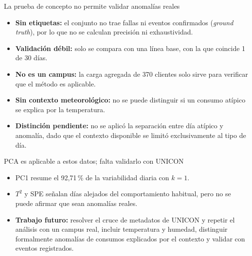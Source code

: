 \begin{frame}{La prueba de concepto no permite validar anomalías reales}
    \begin{itemize}
        \item \textbf{Sin etiquetas:} el conjunto no trae fallas ni eventos confirmados (\emph{ground truth}), por lo que no se calculan precisión ni exhaustividad.
        \item \textbf{Validación débil:} solo se compara con una línea base, con la que coincide 1 de 30 días.
        \item \textbf{No es un campus:} la carga agregada de 370 clientes solo sirve para verificar que el método es aplicable.
        \item \textbf{Sin contexto meteorológico:} no se puede distinguir si un consumo atípico se explica por la temperatura.
        \item \textbf{Distinción pendiente:} no se aplicó la separación entre día atípico y anomalía, dado que el contexto disponible se limitó exclusivamente al tipo de día.
    \end{itemize}
\end{frame}

\begin{frame}{PCA es aplicable a estos datos; falta validarlo con UNICON}
    \begin{itemize}
        \item PC1 resume el 92{,}71\,\% de la variabilidad diaria con $k=1$.
        \item $T^2$ y SPE señalan días alejados del comportamiento habitual, pero no se puede afirmar que sean anomalías reales.
        \item \textbf{Trabajo futuro:} resolver el cruce de metadatos de UNICON y repetir el análisis con un campus real, incluir temperatura y humedad, distinguir formalmente anomalías de consumos explicados por el contexto y validar con eventos registrados.
    \end{itemize}
\end{frame}
